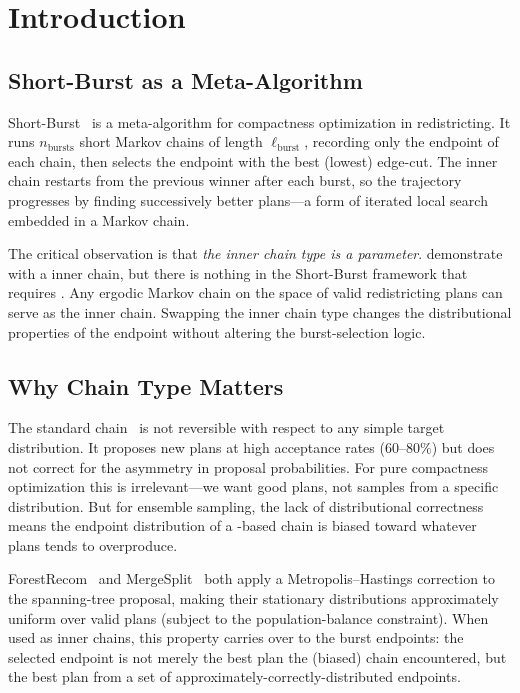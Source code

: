 \section{Introduction}
\label{sec:introduction}

\subsection{Short-Burst as a Meta-Algorithm}

Short-Burst~\citep{cannon2022,g6paper} is a meta-algorithm for compactness
optimization in redistricting.
It runs $n_{\mathrm{bursts}}$ short Markov chains of length
$\ell_{\mathrm{burst}}$, recording only the endpoint of each chain, then
selects the endpoint with the best (lowest) edge-cut.
The inner chain restarts from the previous winner after each burst, so
the trajectory progresses by finding successively better plans---a form
of iterated local search embedded in a Markov chain.

The critical observation is that \emph{the inner chain type is a parameter}.
\citet{cannon2022} demonstrate \sburst{} with a \recom{} inner chain, but
there is nothing in the Short-Burst framework that requires \recom{}.
Any ergodic Markov chain on the space of valid redistricting plans can
serve as the inner chain.
Swapping the inner chain type changes the distributional properties of the
endpoint without altering the burst-selection logic.

\subsection{Why Chain Type Matters}

The standard \recom{} chain~\citep{deford2021} is not reversible with
respect to any simple target distribution.
It proposes new plans at high acceptance rates ($60$--$80\%$) but does not
correct for the asymmetry in proposal probabilities.
For pure compactness optimization this is irrelevant---we want good plans,
not samples from a specific distribution.
But for ensemble sampling, the lack of distributional correctness means
the endpoint distribution of a \recom{}-based \sburst{} chain is biased
toward whatever plans \recom{} tends to overproduce.

ForestRecom~\citep{mccartan2020,g9paper} and MergeSplit~\citep{janson2022,g10paper}
both apply a Metropolis--Hastings correction to the spanning-tree proposal,
making their stationary distributions approximately uniform over valid plans
(subject to the population-balance constraint).
When used as \sburst{} inner chains, this property carries over to the
burst endpoints: the selected endpoint is not merely the best plan the
(biased) chain encountered, but the best plan from a set of
approximately-correctly-distributed endpoints.

